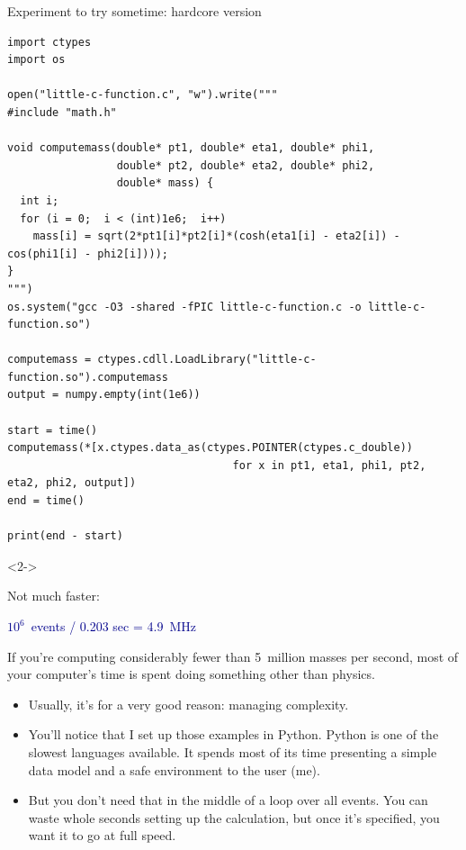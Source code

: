 \documentclass[aspectratio=169]{beamer}
\begin{document}
\begin{frame}[fragile]{Experiment to try sometime: hardcore version}
\vspace{0.1 cm}
\scriptsize
\begin{verbatim}
import ctypes
import os

open("little-c-function.c", "w").write("""
#include "math.h"

void computemass(double* pt1, double* eta1, double* phi1,
                 double* pt2, double* eta2, double* phi2,
                 double* mass) {
  int i;
  for (i = 0;  i < (int)1e6;  i++)
    mass[i] = sqrt(2*pt1[i]*pt2[i]*(cosh(eta1[i] - eta2[i]) - cos(phi1[i] - phi2[i])));
}
""")
os.system("gcc -O3 -shared -fPIC little-c-function.c -o little-c-function.so")

computemass = ctypes.cdll.LoadLibrary("little-c-function.so").computemass
output = numpy.empty(int(1e6))

start = time()
computemass(*[x.ctypes.data_as(ctypes.POINTER(ctypes.c_double))
                                   for x in pt1, eta1, phi1, pt2, eta2, phi2, output])
end = time()

print(end - start)
\end{verbatim}
\normalsize
\vspace{-8 cm}\hfill\begin{minipage}{0.35\linewidth}
\begin{uncoverenv}<2->
\begin{center}
Not much faster:

\textcolor{darkblue}{$10^6$~events / 0.203 sec = 4.9~MHz}
\end{center}
\end{uncoverenv}
\vspace{8 cm}
\end{minipage}
\end{frame}

\begin{frame}{}
\vspace{1 cm}
\begin{center}
\large If you're computing considerably fewer than 5~million masses per second, most of your computer's time is spent doing something other than physics.
\end{center}

\vspace{0.5 cm}
\begin{itemize}
\item<2-> Usually, it's for a very good reason: managing complexity.
\item<3-> You'll notice that I set up those examples in Python. Python is one of the slowest languages available. It spends most of its time presenting a simple data model and a safe environment to the user (me).
\item<4-> But you don't need that in the middle of a loop over all events. You can waste whole seconds setting up the calculation, but once it's specified, you want it to go at full speed.
\end{itemize}
\end{frame}
\end{document}
